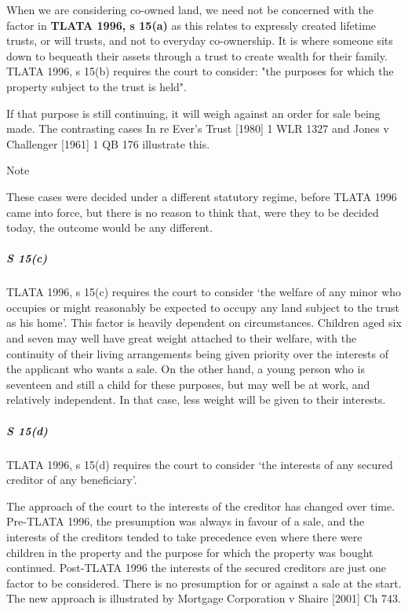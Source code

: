 \documentclass[
]{article}
\newenvironment{env-881a4bd6-779e-4404-ae5b-86f77846f864}
{
    \savenotes\tcolorbox[blanker,breakable,left=5pt,borderline west={2pt}{-4pt}{blue}]
}
{
    \endtcolorbox\spewnotes
}
\begin{document}
When we are considering co-owned land, we need not be concerned with the
factor in \textbf{TLATA 1996, s 15(a)} as this relates to expressly
created lifetime trusts, or will trusts, and not to everyday
co-ownership. It is where someone sits down to bequeath their assets
through a trust to create wealth for their family. TLATA 1996, s 15(b)
requires the court to consider: "the purposes for which the property
subject to the trust is held".

If that purpose is still continuing, it will weigh against an order for
sale being made. The contrasting cases In re Ever's Trust {[}1980{]} 1
WLR 1327 and Jones v Challenger {[}1961{]} 1 QB 176 illustrate this.

\begin{env-881a4bd6-779e-4404-ae5b-86f77846f864}

Note

These cases were decided under a different statutory regime, before
TLATA 1996 came into force, but there is no reason to think that, were
they to be decided today, the outcome would be any different.

\end{env-881a4bd6-779e-4404-ae5b-86f77846f864}

\hypertarget{s-15c}{%
\subparagraph{S 15(c)}\label{s-15c}}

TLATA 1996, s 15(c) requires the court to consider `the welfare of any
minor who occupies or might reasonably be expected to occupy any land
subject to the trust as his home'. This factor is heavily dependent on
circumstances. Children aged six and seven may well have great weight
attached to their welfare, with the continuity of their living
arrangements being given priority over the interests of the applicant
who wants a sale. On the other hand, a young person who is seventeen and
still a child for these purposes, but may well be at work, and
relatively independent. In that case, less weight will be given to their
interests.

\hypertarget{s-15d}{%
\subparagraph{S 15(d)}\label{s-15d}}

TLATA 1996, s 15(d) requires the court to consider `the interests of any
secured creditor of any beneficiary'.

The approach of the court to the interests of the creditor has changed
over time. Pre-TLATA 1996, the presumption was always in favour of a
sale, and the interests of the creditors tended to take precedence even
where there were children in the property and the purpose for which the
property was bought continued. Post-TLATA 1996 the interests of the
secured creditors are just one factor to be considered. There is no
presumption for or against a sale at the start. The new approach is
illustrated by Mortgage Corporation v Shaire {[}2001{]} Ch 743.
\end{document}

